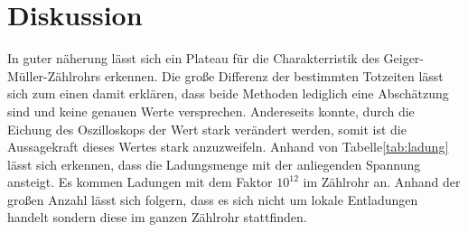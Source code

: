 \section{Diskussion}
\label{sec:Diskussion}
In guter näherung lässt sich ein Plateau für die Charakterristik des Geiger-Müller-Zählrohrs erkennen.
Die große Differenz der bestimmten Totzeiten lässt sich zum einen damit erklären, dass beide Methoden lediglich eine Abschätzung sind und keine genauen Werte versprechen.
Andereseits konnte, durch die Eichung des Oszilloskops der Wert stark verändert werden, somit ist die Aussagekraft dieses Wertes stark anzuzweifeln.
Anhand von Tabelle\ref{tab:ladung} lässt sich erkennen, dass die Ladungsmenge mit der anliegenden Spannung ansteigt.
Es kommen Ladungen mit dem Faktor $10^{12}$ im Zählrohr an.
Anhand der großen Anzahl lässt sich folgern, dass es sich nicht um lokale Entladungen handelt sondern diese im ganzen Zählrohr stattfinden.
  
